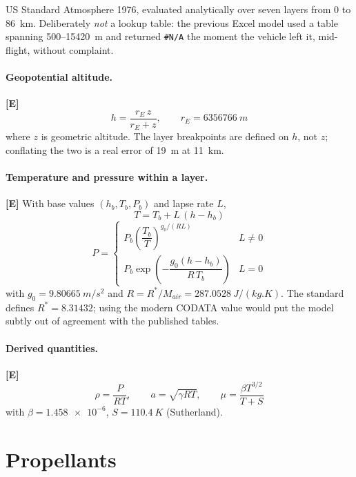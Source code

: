 \documentclass[11pt,a4paper]{article}
\newcommand{\established}{\textcolor{okgreen}{\textbf{[E]}}\xspace}
\begin{document}
US Standard Atmosphere 1976, evaluated analytically over seven layers from
\SI{0}{} to \SI{86}{km}. Deliberately \emph{not} a lookup table: the previous
Excel model used a table spanning 500--\SI{15420}{m} and returned
\texttt{\#N/A} the moment the vehicle left it, mid-flight, without complaint.

\paragraph{Geopotential altitude.} \established
\begin{equation}
h = \frac{r_E\,z}{r_E + z}, \qquad r_E = \SI{6356766}{m}
\end{equation}
where $z$ is geometric altitude. The layer breakpoints are defined on $h$, not
$z$; conflating the two is a real error of \SI{19}{m} at \SI{11}{km}.

\paragraph{Temperature and pressure within a layer.} \established
With base values $(h_b, T_b, P_b)$ and lapse rate $L$,
\begin{equation}
T = T_b + L\,(h - h_b)
\end{equation}
\begin{equation}
P =
\begin{cases}
P_b \left(\dfrac{T_b}{T}\right)^{g_0/(R L)} & L \neq 0 \\[3mm]
P_b \exp\!\left(-\dfrac{g_0 (h-h_b)}{R\,T_b}\right) & L = 0
\end{cases}
\end{equation}
with $g_0 = \SI{9.80665}{m/s^2}$ and $R = R^*/M_{air} = \SI{287.0528}{J/(kg.K)}$.
The standard defines $R^* = 8.31432$; using the modern CODATA value would put
the model subtly out of agreement with the published tables.

\paragraph{Derived quantities.} \established
\begin{equation}
\rho = \frac{P}{R T}, \qquad
a = \sqrt{\gamma R T}, \qquad
\mu = \frac{\beta T^{3/2}}{T + S}
\end{equation}
with $\beta = \num{1.458e-6}$, $S = \SI{110.4}{K}$ (Sutherland).

\section{Propellants}
\end{document}
